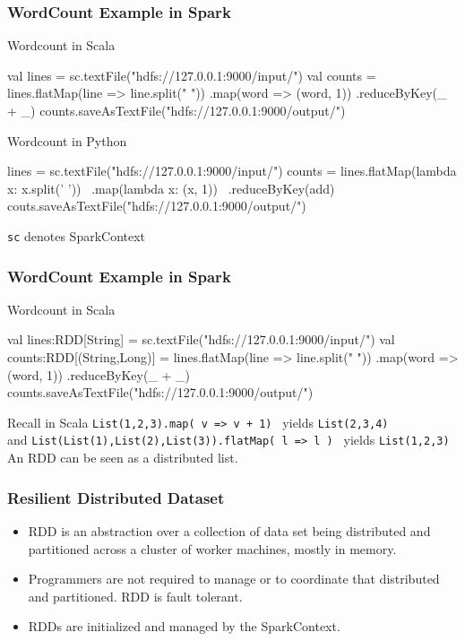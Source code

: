 \documentclass{beamer}
\newcommand{\beb}{\begin{exampleblock}}
\newcommand{\eeb}{\end{exampleblock}}
\begin{document}
\begin{frame}[fragile]
\frametitle{WordCount Example in Spark}

\beb{Wordcount in Scala} 
\begin{code}
val lines = sc.textFile("hdfs://127.0.0.1:9000/input/")
val counts = lines.flatMap(line => line.split(" "))
    .map(word => (word, 1))
    .reduceByKey(_ + _)
counts.saveAsTextFile("hdfs://127.0.0.1:9000/output/")
\end{code} \eeb

\beb{Wordcount in Python}
\begin{code}
lines = sc.textFile("hdfs://127.0.0.1:9000/input/")
counts = lines.flatMap(lambda x: x.split(' ')) \
              .map(lambda x: (x, 1)) \
              .reduceByKey(add)
couts.saveAsTextFile("hdfs://127.0.0.1:9000/output/")
\end{code} \eeb
{\tt sc} denotes SparkContext 
\end{frame}




\begin{frame}[fragile]
\frametitle{WordCount Example in Spark}

\beb{Wordcount in Scala} 
\begin{code}
val lines:RDD[String] = 
    sc.textFile("hdfs://127.0.0.1:9000/input/")
val counts:RDD[(String,Long)] = 
    lines.flatMap(line => line.split(" "))
    .map(word => (word, 1))
    .reduceByKey(_ + _)
counts.saveAsTextFile("hdfs://127.0.0.1:9000/output/")
\end{code} \eeb
Recall in Scala {\tt  List(1,2,3).map( v => v + 1) }
yields  {\tt List(2,3,4) } \\ 
and {\tt List(List(1),List(2),List(3)).flatMap( l => l ) } 
yields
{\tt List(1,2,3) }
\\
An RDD can be seen as a distributed list. 
\end{frame}


\begin{frame}[fragile]
\frametitle{Resilient Distributed Dataset}

\begin{itemize} 
\item RDD is an abstraction over a collection of data set being distributed
and partitioned across a cluster of worker machines, mostly in memory.
\item Programmers are not required to manage or to coordinate that
distributed and partitioned. RDD is fault tolerant.  
\item RDDs are initialized and managed by the SparkContext.
\end{itemize}
\end{frame}
\end{document}
